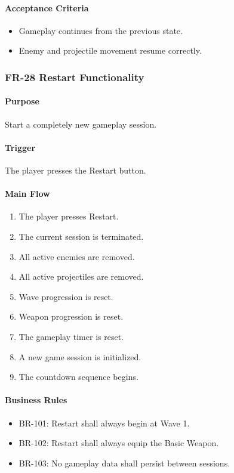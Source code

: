 \documentclass[11pt,a4paper]{article}
\begin{document}
\paragraph{Acceptance Criteria}
\begin{itemize}
  \item Gameplay continues from the previous state.
  \item Enemy and projectile movement resume correctly.
\end{itemize}

\subsubsection{FR-28 Restart Functionality}

\paragraph{Purpose}
Start a completely new gameplay session.

\paragraph{Trigger}
The player presses the Restart button.

\paragraph{Main Flow}
\begin{enumerate}
  \item The player presses Restart.
  \item The current session is terminated.
  \item All active enemies are removed.
  \item All active projectiles are removed.
  \item Wave progression is reset.
  \item Weapon progression is reset.
  \item The gameplay timer is reset.
  \item A new game session is initialized.
  \item The countdown sequence begins.
\end{enumerate}

\paragraph{Business Rules}
\begin{itemize}
  \item BR-101: Restart shall always begin at Wave 1.
  \item BR-102: Restart shall always equip the Basic Weapon.
  \item BR-103: No gameplay data shall persist between sessions.
\end{itemize}
\end{document}
